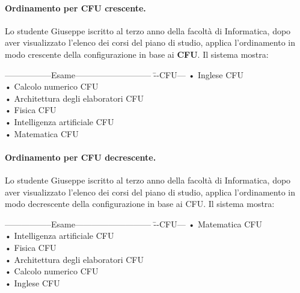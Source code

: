 \paragraph{Ordinamento per CFU crescente.}
Lo studente Giuseppe iscritto al terzo anno della facoltà di Informatica, dopo aver visualizzato l'elenco dei corsi del piano di studio, applica l'ordinamento in modo crescente della configurazione in base ai  \textbf{CFU}. Il sistema mostra:

\begin{tabbing}
	\hspace{1cm}-----------------Esame--------------------------- \= --CFU---\kill
	\hspace{1cm} • Inglese  CFU  \\	
	\hspace{1cm} • Calcolo numerico  CFU \\	
	\hspace{1cm} • Architettura degli elaboratori  CFU  \\
	\hspace{1cm} • Fisica  CFU \\
	\hspace{1cm} • Intelligenza artificiale	  CFU \\
	\hspace{1cm} • Matematica  CFU \\
\end{tabbing}

\paragraph{Ordinamento per CFU decrescente.}
Lo studente Giuseppe iscritto al terzo anno della facoltà di Informatica, dopo aver visualizzato l'elenco dei corsi del piano di studio, applica l'ordinamento in modo decrescente della configurazione in base ai CFU. Il sistema mostra:

\begin{tabbing}
	\hspace{1cm}-----------------Esame--------------------------- \= --CFU---\kill
	\hspace{1cm} • Matematica  CFU \\
	\hspace{1cm} • Intelligenza artificiale	  CFU \\
	\hspace{1cm} • Fisica  CFU \\
	\hspace{1cm} • Architettura degli elaboratori  CFU  \\
	\hspace{1cm} • Calcolo numerico  CFU \\	
	\hspace{1cm} • Inglese  CFU  \\	
\end{tabbing}

